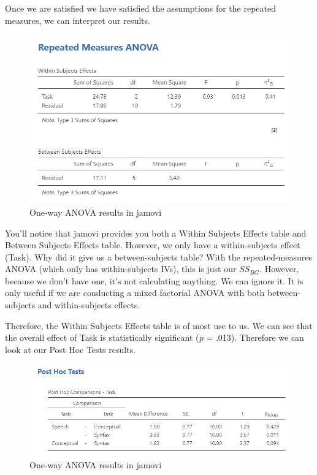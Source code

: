 \documentclass[
]{book}
\begin{document}
Once we are satisfied we have satisfied the assumptions for the repeated measures, we can interpret our results.

\begin{figure}

{\centering \includegraphics[width=1\linewidth]{images/05-repeated-measures-anova/rm-anova_results} 

}

\caption{One-way ANOVA results in jamovi}\label{fig:unnamed-chunk-6}
\end{figure}

You'll notice that jamovi provides you both a Within Subjects Effects table and Between Subjects Effects table. However, we only have a within-subjects effect (Task). Why did it give us a between-subjects table? With the repeated-measures ANOVA (which only has within-subjects IVs), this is just our \(SS_{BG}\). However, because we don't have one, it's not calculating anything. We can ignore it. It is only useful if we are conducting a mixed factorial ANOVA with both between-subjects and within-subjects effects.

Therefore, the Within Subjects Effects table is of most use to us. We can see that the overall effect of Task is statistically significant (\emph{p} = .013). Therefore we can look at our Post Hoc Tests results.

\begin{figure}

{\centering \includegraphics[width=1\linewidth]{images/05-repeated-measures-anova/rm-anova_tukey} 

}

\caption{One-way ANOVA results in jamovi}\label{fig:unnamed-chunk-7}
\end{figure}
\end{document}
